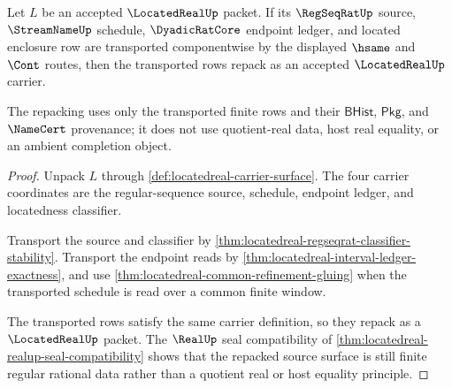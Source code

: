 \begin{theorem}
\label{thm:locatedreal-scope-carrier-transport}
Let $L$ be an accepted $\LocatedRealUp$ packet. If its $\RegSeqRatUp$ source, $\StreamNameUp$ schedule, $\DyadicRatCore$ endpoint ledger, and located enclosure row are transported componentwise by the displayed $\hsame$ and $\Cont$ routes, then the transported rows repack as an accepted $\LocatedRealUp$ carrier.

The repacking uses only the transported finite rows and their $\mathsf{BHist}$, $\mathsf{Pkg}$, and $\NameCert$ provenance; it does not use quotient-real data, host real equality, or an ambient completion object.
\end{theorem}
\begin{proof}
Unpack $L$ through \autoref{def:locatedreal-carrier-surface}. The four carrier coordinates are the regular-sequence source, schedule, endpoint ledger, and locatedness classifier.

Transport the source and classifier by \autoref{thm:locatedreal-regseqrat-classifier-stability}. Transport the endpoint reads by \autoref{thm:locatedreal-interval-ledger-exactness}, and use \autoref{thm:locatedreal-common-refinement-gluing} when the transported schedule is read over a common finite window.

The transported rows satisfy the same carrier definition, so they repack as a $\LocatedRealUp$ packet. The $\RealUp$ seal compatibility of \autoref{thm:locatedreal-realup-seal-compatibility} shows that the repacked source surface is still finite regular rational data rather than a quotient real or host equality principle.
\end{proof}

